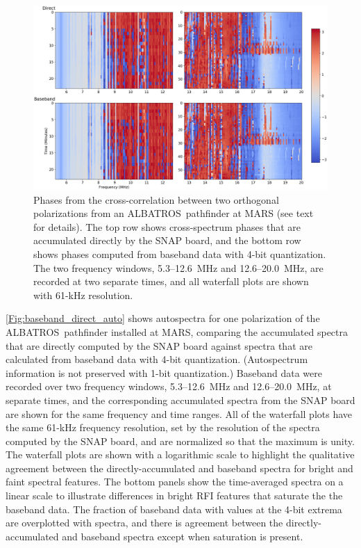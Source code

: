 \documentclass{ws-jai}
\def\albatros{ALBATROS}
\begin{document}
\begin{figure}[t]
  \begin{center}
    \includegraphics[width=\linewidth]{Figures/baseband_direct_phase_compare.png}
    \caption{Phases from the cross-correlation between two orthogonal
      polarizations from an \albatros\ pathfinder at MARS (see text
      for details).  The top row shows cross-spectrum phases that are
      accumulated directly by the SNAP board, and the bottom row shows
      phases computed from baseband data with 4-bit quantization.  The
      two frequency windows, 5.3--12.6~MHz and 12.6--20.0~MHz, are
      recorded at two separate times, and all waterfall plots are
      shown with 61-kHz resolution.}
    \label{Fig:baseband_direct_phase}
  \end{center}
\end{figure}

\autoref{Fig:baseband_direct_auto} shows autospectra for one
polarization of the \albatros\ pathfinder installed at MARS, comparing
the accumulated spectra that are directly computed by the SNAP board
against spectra that are calculated from baseband data with 4-bit
quantization.  (Autospectrum information is not preserved with 1-bit
quantization.)  Baseband data were recorded over two frequency
windows, 5.3--12.6~MHz and 12.6--20.0~MHz, at separate times, and the
corresponding accumulated spectra from the SNAP board are shown for
the same frequency and time ranges.  All of the waterfall plots have
the same 61-kHz frequency resolution, set by the resolution of the
spectra computed by the SNAP board, and are normalized so that the
maximum is unity.  The waterfall plots are shown with a logarithmic
scale to highlight the qualitative agreement between the
directly-accumulated and baseband spectra for bright and faint
spectral features.  The bottom panels show the time-averaged spectra
on a linear scale to illustrate differences in bright RFI features
that saturate the the baseband data.  The fraction of baseband data
with values at the 4-bit extrema are overplotted with spectra, and
there is agreement between the directly-accumulated and baseband
spectra except when saturation is present.
\end{document}
